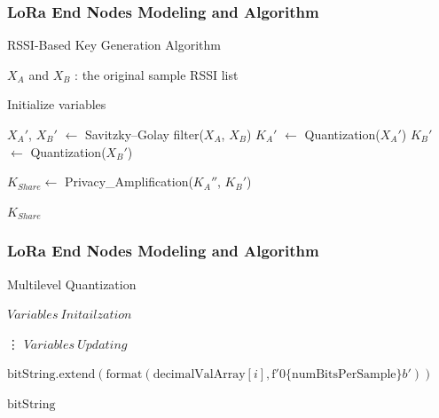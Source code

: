 \documentclass{beamer}
\begin{document}
\begin{frame}
  \frametitle{LoRa End Nodes Modeling and Algorithm}
  \begin{algorithm}[H]
    \caption{RSSI-Based Key Generation Algorithm}\label{alg:keygeneration}
    \begin{algorithmic}
    
    \Require $X_A$ and $X_B$ :  the original sample RSSI list
    
    \State Initialize variables
    
    \State $X_A'$, $X_B'$ $\gets$ Savitzky–Golay filter($X_A$, $X_B$)
    \Repeat
        \State $K_A'$ $\gets$ Quantization($X_A'$)
        \State $K_B'$ $\gets$ Quantization($X_B'$)
    
    \State $K_{Share} \gets$ Privacy\_Amplification($K_A''$, $K_B'$)
    
    \State \Return $K_{Share}$ 
    
    \end{algorithmic}
  \end{algorithm}
\end{frame}

\begin{frame}
  \frametitle{LoRa End Nodes Modeling and Algorithm}
  \begin{algorithm}[H]
    \caption{Multilevel Quantization}\label{alg:Quantization}
    \begin{algorithmic}
        \State $Variables\ Initailzation$
    
                \State \vdots {}
            \EndFor
        \EndFor
        \State $Variables\ Updating$
    
            \State $\text{bitString}.\text{extend}(\text{format}(\text{decimalValArray}[i], \text{f}'0\{\text{numBitsPerSample}\}b'))$
        \EndFor
    
        \State \Return $\text{bitString}$
    \EndFunction
    \end{algorithmic}
  \end{algorithm}
\end{frame}
\end{document}
